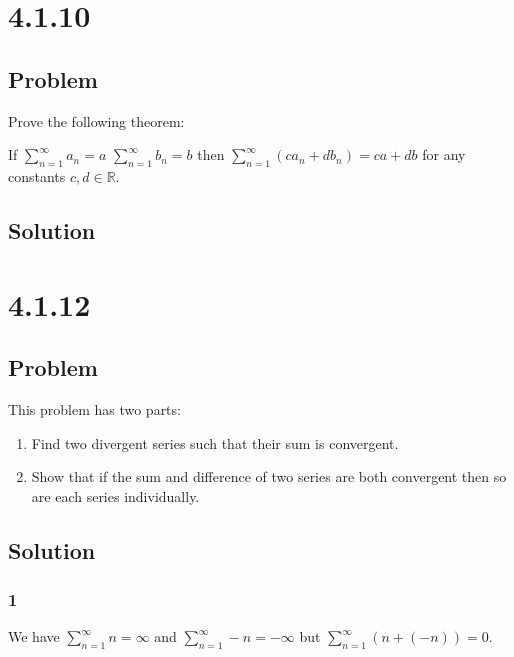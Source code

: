 \documentclass[12pt]{article}
\newcommand{\R}    [0]{\mathbb{R}                   }
\begin{document}
\section*{4.1.10}

\subsection*{Problem}
Prove the following theorem:

If $\sum_{n = 1}^\infty a_n = a$ $\sum_{n = 1}^\infty b_n = b$ then $\sum_{n = 1}^\infty (c a_n + d b_n) = ca + db$ for any constants $c, d \in \R$.

\subsection*{Solution}



\section*{4.1.12}

\subsection*{Problem}
This problem has two parts:
\begin{enumerate}
    \item Find two divergent series such that their sum is convergent.
    \item Show that if the sum and difference of two series are both convergent then so are each series individually.
\end{enumerate}

\subsection*{Solution}

\subsubsection*{1}
We have $\sum_{n=1}^\infty n = \infty$ and $\sum_{n=1}^\infty -n = -\infty$ but $\sum_{n=1}^\infty (n + (-n)) = 0$.
\end{document}
